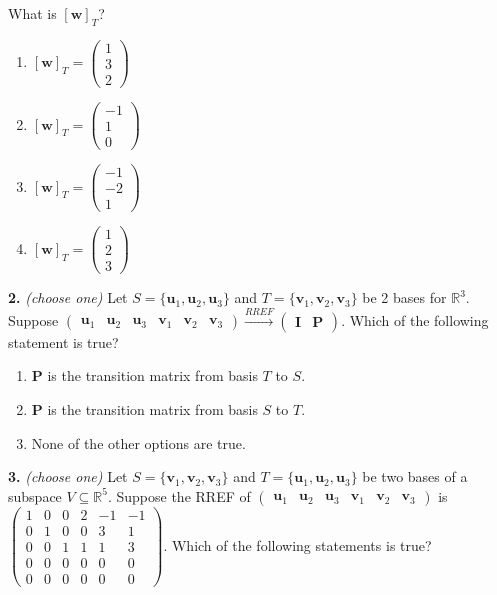 \documentclass[10pt,a4paper]{article}
\begin{document}
What is \([\mathbf{w}]_T\)?

\begin{enumerate}[label=(\Alph*)]
\item \([\mathbf{w}]_T=\begin{pmatrix}1\\3\\2\end{pmatrix}\)
\item \([\mathbf{w}]_T=\begin{pmatrix}-1\\1\\0\end{pmatrix}\)
\item \([\mathbf{w}]_T=\begin{pmatrix}-1\\-2\\1\end{pmatrix}\)
\item \([\mathbf{w}]_T=\begin{pmatrix}1\\2\\3\end{pmatrix}\)
\end{enumerate}
\smallskip
\textbf{2.} \textit{(choose one)} Let \(S=\{\mathbf{u}_1,\mathbf{u}_2,\mathbf{u}_3\}\) and \(T=\{\mathbf{v}_1,\mathbf{v}_2,\mathbf{v}_3\}\) be 2 bases for \(\mathbb{R}^3\). Suppose \((\begin{array}{ccc|ccc}\mathbf{u}_1&\mathbf{u}_2&\mathbf{u}_3&\mathbf{v}_1&\mathbf{v}_2&\mathbf{v}_3\end{array})\xrightarrow{RREF}(\begin{array}{c|c}\mathbf{I}&\mathbf{P}\end{array})\). Which of the following statement is true?

\begin{enumerate}[label=(\Alph*)]
\item \(\mathbf{P}\) is the transition matrix from basis \(T\) to \(S\).
\item \(\mathbf{P}\) is the transition matrix from basis \(S\) to \(T\).
\item None of the other options are true.
\end{enumerate}
\smallskip
\textbf{3.} \textit{(choose one)} Let \(S=\{\mathbf{v}_1,\mathbf{v}_2,\mathbf{v}_3\}\) and \(T=\{\mathbf{u}_1,\mathbf{u}_2,\mathbf{u}_3\}\) be two bases of a subspace \(V\subseteq\mathbb{R}^5\). Suppose the RREF of \((\begin{array}{ccc|c|c|c}\mathbf{u}_1&\mathbf{u}_2&\mathbf{u}_3&\mathbf{v}_1&\mathbf{v}_2&\mathbf{v}_3\end{array})\) is \(\left(\begin{array}{ccc|c|c|c}1&0&0&2&-1&-1\\0&1&0&0&3&1\\0&0&1&1&1&3\\0&0&0&0&0&0\\0&0&0&0&0&0\end{array}\right)\). Which of the following statements is true?
\end{document}
